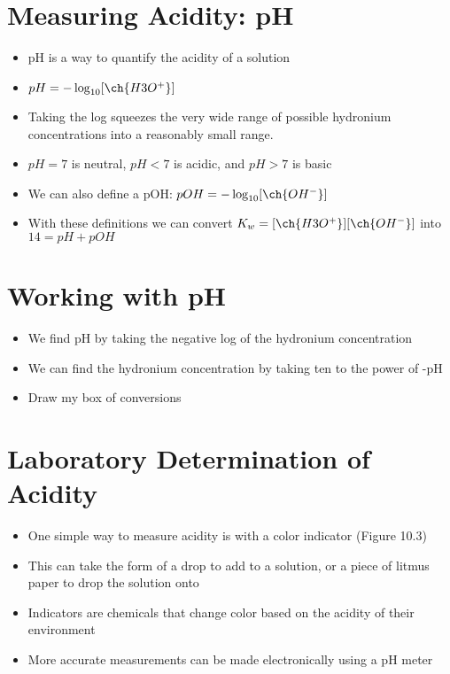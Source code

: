 \documentclass[12pt, openany, letterpaper]{memoir}
\begin{document}
\section{Measuring Acidity: pH}
\begin{itemize}
	\item pH is a way to quantify the acidity of a solution
	\item $pH=-\log_{10}[\ch{H3O^+}]$
	\item Taking the log squeezes the very wide range of possible hydronium concentrations into a reasonably small range.
	\item $pH=7$ is neutral, $pH<7$ is acidic, and $pH>7$ is basic
	\item We can also define a pOH: $pOH=-\log_{10}[\ch{OH^-}]$
	\item With these definitions we can convert $K_w=[\ch{H3O^+}][\ch{OH^-}]$ into $14=pH+pOH$
\end{itemize}

\section{Working with pH}
\begin{itemize}
	\item We find pH by taking the negative log of the hydronium concentration
	\item We can find the hydronium concentration by taking ten to the power of -pH
	\item Draw my box of conversions
\end{itemize}

\section{Laboratory Determination of Acidity}
\begin{itemize}
	\item One simple way to measure acidity is with a color indicator (Figure 10.3)
	\item This can take the form of a drop to add to a solution, or a piece of litmus paper to drop the solution onto
	\item Indicators are chemicals that change color based on the acidity of their environment
	\item More accurate measurements can be made electronically using a pH meter
\end{itemize}
\end{document}
